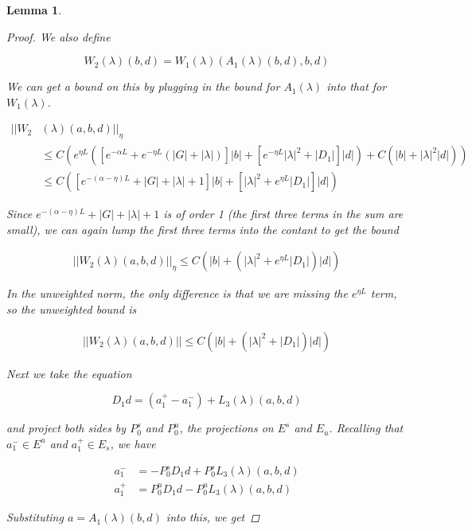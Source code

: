 \documentclass[12pt]{article}
\newtheorem{lemma}{Lemma}
\begin{document}
\begin{lemma}
\begin{proof}
We also define

\begin{equation}\label{W2def}
W_2(\lambda)(b,d) = W_1(\lambda)(A_1(\lambda)(b,d),b,d)
\end{equation}

We can get a bound on this by plugging in the bound for $A_1(\lambda)$ into that for $W_1(\lambda)$.

\begin{align*}
||W_2&(\lambda)(a,b,d)||_\eta \\
&\leq C\left( e^{\eta L} \left( \left[e^{-\alpha L} + e^{-\eta L} \left(|G| + |\lambda|\right) \right]|b| + \left[ e^{-\eta L} |\lambda|^2 + |D_1| \right] |d| \right) + C( |b| + |\lambda|^2 |d| ) \right)\\
&\leq C \left( \left[e^{-(\alpha-\eta) L} + |G| + |\lambda| + 1 \right] |b| 
+ \left[ |\lambda|^2 + e^{\eta L}|D_1| \right] |d|\right)
\end{align*} 

Since $e^{-(\alpha-\eta) L} + |G| + |\lambda| + 1$ is of order 1 (the first three terms in the sum are small), we can again lump the first three terms into the contant to get the bound

\begin{align*}
||W_2(\lambda)(a,b,d)||_\eta \leq C \left( |b| + \left( |\lambda|^2 + e^{\eta L}|D_1| \right) |d|\right)
\end{align*} 

In the unweighted norm, the only difference is that we are missing the $e^{\eta L}$ term, so the unweighted bound is

\begin{align*}
||W_2(\lambda)(a,b,d)|| \leq C \left( |b| + \left( |\lambda|^2 + |D_1| \right) |d|\right)
\end{align*} 

Next we take the equation

\[
D_1 d = (a^+_1 - a^-_1) + L_3(\lambda)(a,b,d)
\]

and project both sides by $P_0^s$ and $P_0^u$, the projections on $E^s$ and $E_u$. Recalling that $a^-_1 \in E^u$ and $a^+_1 \in E_s$, we have

\begin{align*}
a^-_1 &= -P_0^s D_1 d + P_0^s L_3(\lambda)(a,b,d) \\
a^+_1 &= P_0^u D_1 d - P_0^u L_3(\lambda)(a,b,d)
\end{align*}

Substituting $a = A_1(\lambda)(b,d)$ into this, we get


\end{proof}
\end{lemma}
\end{document}
